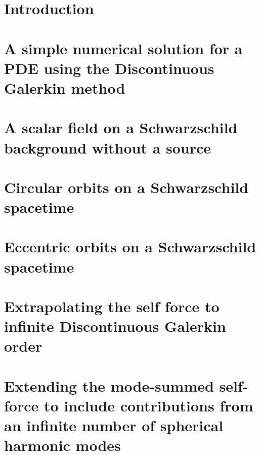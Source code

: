 \documentclass[12pt,letterpaper]{lsuetd}
\begin{document}
\singlespacing
\setlength{\textfloatsep}{12pt plus 2pt minus 2pt}
\setlength{\intextsep}{6pt plus 2pt minus 2pt}
\chapter{Introduction}
\doublespacing

\pagebreak
\singlespacing
\chapter{A simple numerical solution for a PDE using the Discontinuous Galerkin method}
\doublespacing

\pagebreak
\singlespacing
\chapter{A scalar field on a Schwarzschild background without a source}
\doublespacing

\pagebreak
\singlespacing
\chapter{Circular orbits on a Schwarzschild spacetime}
\doublespacing

\label{circularorbit}
\pagebreak
\singlespacing
\chapter{Eccentric orbits on a Schwarzschild spacetime}
\doublespacing

\label{ellipticalorb}
\pagebreak
\singlespacing
\chapter{Extrapolating the self force to infinite Discontinuous Galerkin order}
\label{finfchap}
\doublespacing

\pagebreak
\singlespacing
\chapter{Extending the mode-summed self-force to include contributions from an infinite number of spherical harmonic modes}
\doublespacing

\label{lmode}
\pagebreak
\singlespacing
\end{document}
